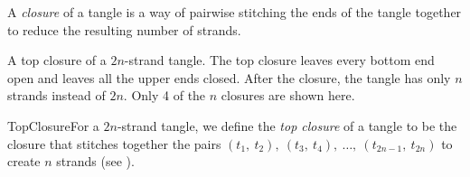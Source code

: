 \begin{paper}
A \textit{closure} of a tangle is a way of pairwise stitching the ends of the
tangle together to reduce the resulting number of strands.

{A top closure of a $2n$-strand tangle.
The top closure leaves every bottom end open and leaves all the upper ends
closed.
After the closure, the tangle has only $n$ strands instead of $2n$.
Only 4 of the $n$ closures are shown here.}

\begin{paperdef}{TopClosure}{For a $2n$-strand tangle, we define the
\textit{top closure} of a tangle to be the closure that stitches together the
pairs $(t_1,~t_2),~(t_3,~t_4),~\dots,~(t_{2n-1},~t_{2n})$ to create
$n$ strands (see \figTop).}\end{paperdef}


\end{paper}
